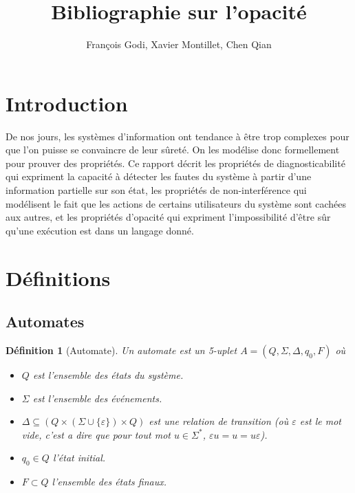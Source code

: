 \documentclass[10pt,a4paper]{article}
\newtheorem{mydef}{D\'efinition}
\begin{document}
    \title{Bibliographie sur l'opacit\'e}

    \author{François Godi, Xavier Montillet, Chen Qian}

\maketitle


\section*{Introduction}

De nos jours, les syst\`emes d'information ont tendance \`a \^etre trop complexes pour que l'on puisse se convaincre de leur sûret\'e. On les mod\'elise donc formellement pour prouver des propriétés.  Ce rapport d\'ecrit les propri\'et\'es de diagnosticabilit\'e qui expriment la capacit\'e \`a d\'etecter les fautes du syst\`eme \`a partir d'une information partielle sur son \'etat, les propri\'et\'es de non-interf\'erence qui mod\'elisent le fait que les actions de certains utilisateurs du syst\`eme sont cach\'ees aux autres, et les propri\'et\'es d'opacit\'e qui expriment l'impossibilit\'e d'\^etre s\^ur qu'une ex\'ecution est dans un langage donn\'e.

\section{Définitions}

\subsection{Automates}

\begin{mydef}[Automate]
Un automate est un 5-uplet $A = (Q, \Sigma, \Delta, q_0, F)$ o\`u
\begin{itemize}
	\item $Q$ est l'ensemble des états du système.
	\item $\Sigma$ est l'ensemble des événements.
	\item $\Delta \subseteq (Q \times (\Sigma \cup \{\varepsilon\}) \times Q)$ est une relation de transition (o\`u $\varepsilon$ est le mot vide, c'est a dire que pour tout mot $u\in\Sigma^*$, $\varepsilon u = u = u\varepsilon$).
	\item $q_0 \in Q$ l'état initial.
	\item $F \subset Q$ l'ensemble des \'etats finaux.
\end{itemize}
\end{mydef}
\end{document}
